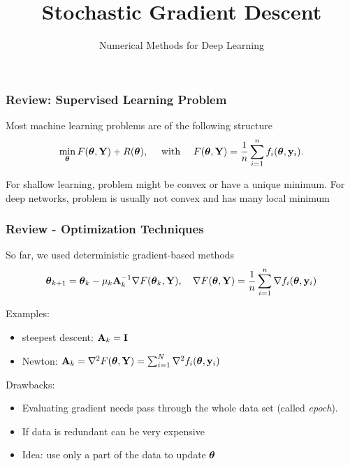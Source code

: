 \documentclass[12pt,fleqn,beamer]{beamer}
\date{}
\title{Stochastic Gradient Descent}
\subtitle{Numerical Methods for Deep Learning}
\begin{document}
\makebeamertitle

\begin{frame}[fragile]\frametitle{Review: Supervised Learning Problem}

Most machine learning problems are of the following structure
$$
\min_{{\boldsymbol \theta}} F({\boldsymbol \theta},{\bf Y}) + R({\boldsymbol \theta}), \quad \text{ with }\quad  F({\boldsymbol \theta},{\bf Y}) = \frac1n\sum_{i=1}^n f_i({\boldsymbol \theta},{\bf y}_i).
$$

\bigskip
\pause

For shallow learning, problem might be convex or have a unique minimum.
For deep networks, problem is usually not convex and has many local minimum

\end{frame}

\begin{frame}[fragile]\frametitle{Review - Optimization Techniques}

So far, we used deterministic gradient-based methods
$$ {\boldsymbol \theta}_{k+1} = {\boldsymbol \theta}_k - \mu_k {\bf A}_k^{-1} \nabla F({\boldsymbol \theta}_k,{\bf Y}), \quad  \nabla F({\boldsymbol \theta},{\bf Y}) = \frac1n  \sum_{i=1}^n \nabla f_i({\boldsymbol \theta}, {\bf y}_i)$$

\smallskip 
\pause

Examples: 
\begin{itemize}
	\item steepest descent: $ {\bf A}_k = {\bf I}$
	\item Newton: ${\bf A}_k = \nabla^{2} F({\boldsymbol \theta},{\bf Y}) = \sum_{i=1}^N \nabla^{2} f_i({\boldsymbol \theta}, {\bf y}_i)$
\end{itemize}

\bigskip
\pause

Drawbacks:
\begin{itemize}
\item
Evaluating gradient needs pass through the whole data set (called \emph{epoch}).
\item
If data is redundant can be very expensive
\item 
Idea: use only a part of the data to update ${\boldsymbol \theta}$
\end{itemize} 



\end{frame}
\end{document}
